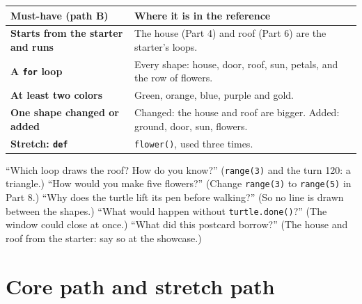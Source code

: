 \documentclass[track=junior,level=3,teacher]{kidscode}
\begin{document}
\begin{center}\small\renewcommand{\arraystretch}{1.3}
\begin{tabularx}{\linewidth}{@{}>{\bfseries}p{4.6cm}X@{}}
\toprule
Must-have (path B) & Where it is in the reference\\
\midrule
Starts from the starter and runs & The house (Part 4) and roof (Part 6) are the starter's loops.\\
A \texttt{for} loop & Every shape: house, door, roof, sun, petals, and the row of flowers.\\
At least two colors & Green, orange, blue, purple and gold.\\
One shape changed or added & Changed: the house and roof are bigger. Added: ground, door, sun, flowers.\\
Stretch: \texttt{def} & \texttt{flower()}, used three times.\\
\bottomrule
\end{tabularx}
\end{center}

\begin{tip}
\enquote{Which loop draws the roof? How do you know?} (\texttt{range(3)} and the turn 120: a triangle.)
\enquote{How would you make five flowers?} (Change \texttt{range(3)} to \texttt{range(5)} in Part 8.)
\enquote{Why does the turtle lift its pen before walking?} (So no line is drawn between the shapes.)
\enquote{What would happen without \texttt{turtle.done()}?} (The window could close at once.)
\enquote{What did this postcard borrow?} (The house and roof from the starter: say so at the showcase.)
\end{tip}

\section{Core path and stretch path}
\end{document}
